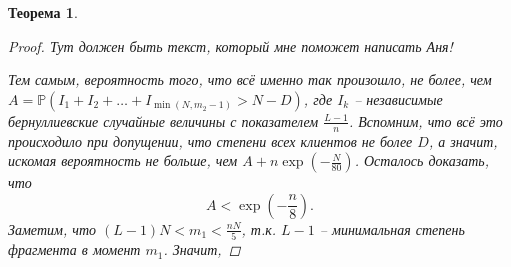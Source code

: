 \documentclass[10pt]{article}
\newcommand{\PRob}{\mathbb P}
\newtheorem{theorem}{Теорема}
\theoremstyle{named}
\begin{document}
\begin{theorem}
\begin{proof}
\bigskip
Тут должен быть текст, который мне поможет написать Аня!
\bigskip

Тем самым, вероятность того, что всё именно так произошло, не более, чем $ A = \PRob(I_1 + I_2 + \dots + I_{\min(N, m_2 - 1)} > N - D)$, 
где $I_k$ -- независимые бернуллиевские случайные величины с показателем $\frac{L-1}{n}$.
Вспомним, что всё это происходило при допущении, что степени всех клиентов не более $D$, 
а значит, искомая вероятность не больше, чем $A +  n\exp\left(-\frac{N}{80}\right)$. Осталось доказать, что 
\begin{equation}
A < \exp\left(- \frac{n}{8}\right).
\end{equation}
Заметим, что $(L-1) N < m_1 < \frac{nN}{5}$, т.к. $L-1$ -- минимальная степень фрагмента в момент $m_1$.
Значит, 

\end{proof}

\end{theorem}
\end{document}
